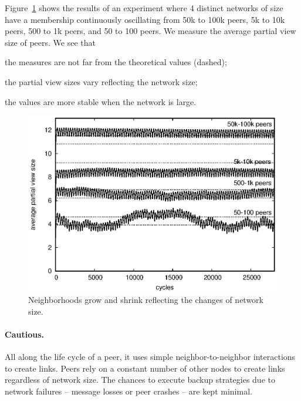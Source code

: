 \noindent Figure~\ref{fig:extended} shows the results of an experiment where 4 distinct
networks of size have a membership continuously oscillating from 50k to 100k peers, 5k
to 10k peers, 500 to 1k peers, and 50 to 100 peers. We measure the average
partial view size of peers. We see that
\begin{inparaenum}[(i)]
\item the measures are not far from the theoretical values (dashed);
\item the partial view sizes vary reflecting the network size;
\item the values are more stable when the network is large.
\end{inparaenum}




\begin{figure}
  \begin{center}
    \includegraphics[width=\SCALE\textwidth]{./img/extended.eps}
    \caption{\label{fig:extended} Neighborhoods grow and shrink reflecting the
      changes of network size.}
  \end{center}
\end{figure}


\paragraph{Cautious.}
All along the life cycle of a peer, it uses simple neighbor-to-neighbor
interactions to create links.  Peers rely on a constant number of other nodes to
create links regardless of network size. The chances to execute backup
strategies due to network failures -- message losses or peer crashes -- are kept
minimal.


